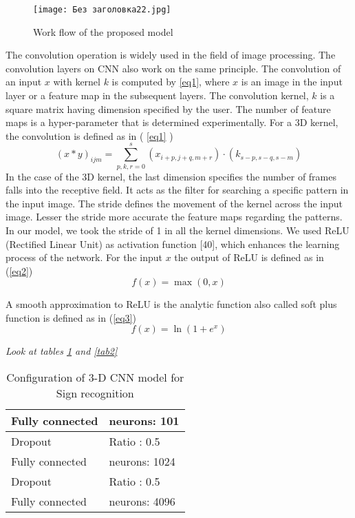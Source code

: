 \documentclass[
  manuscript=article,  %
  layout=preprint,  %
  year=20xx,
  volume=x,
]{joas}
\begin{document}
\begin{figure}[h!]
    \centering
    \texttt{[image: Без заголовка22.jpg]}
    \caption{Work flow of the proposed model}
    \label{f2}
\end{figure}



The convolution operation is widely used in the field of image processing. The convolution layers on CNN also work on the same principle. The convolution of an input $x$ with kernel $k$ is computed by \ref{eq1}, where $x$ is an image in the input layer or a feature map in the subsequent layers. The convolution kernel, $k$ is a square matrix having dimension specified by the user. The number of feature maps is a hyper-parameter that is determined experimentally. For a 3D kernel, the convolution is defined as in ( \ref{eq1} )
\begin{equation}
(x*y)_{ijm}=\sum^s_{p,k,r=0} (x_{i+p,j+q,m+r})\cdot (k_{s-p, s-q, s-m}) \label{eq1}
\end{equation}
In the case of the 3D kernel, the last dimension specifies the number of frames falls into the receptive field. It acts as the filter for searching a specific pattern in the input image. The stride defines the movement of the kernel across the input image. Lesser the stride more accurate the feature maps regarding the patterns. In our model, we took the stride of 1 in all the kernel dimensions. We used ReLU (Rectified Linear Unit) as activation function [40], which enhances the learning process of the network. For the input $x$ the output of ReLU is defined as in (\ref{eq2})
\begin{equation}
f(x)=\max(0,x) \label{eq2}
\end{equation}

A smooth approximation to ReLU is the analytic function also called soft plus function is defined as in (\ref{eq3})
\begin{equation}
f (x) = \ln(1 + e^x) \label{eq3}
\end{equation}






\par {\Huge \emph {Look at tables \ref{tab1} and \ref{tab2}}}


\begin{table}[!ht]
    \centering
    \caption{ Configuration of 3-D CNN model for Sign recognition\label{tab1}}
    \begin{tabular}{|p{6.5cm}|p{6.5cm}|}
    \hline
        Fully connected & neurons: 101\\ \hline
        Dropout & Ratio : 0.5 \\ 
        Fully connected & neurons: 1024 \\ 
        Dropout & Ratio : 0.5 \\ 
        Fully connected & neurons: 4096 \\ 
    \hline
    \end{tabular}
\end{table}
\end{document}
